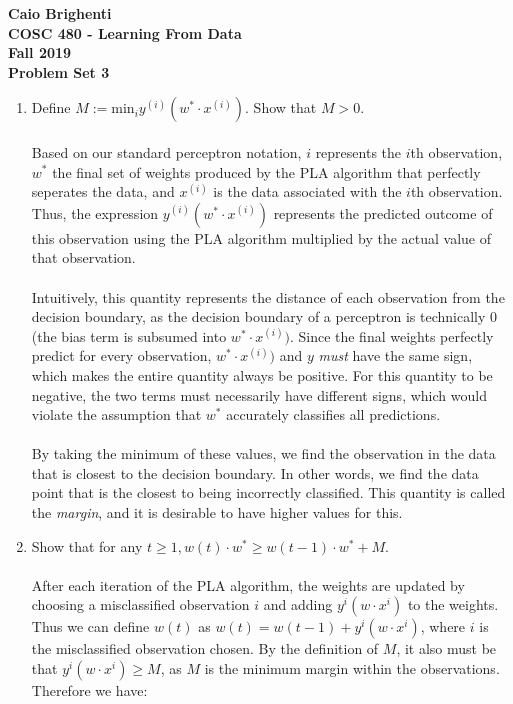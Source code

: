 \documentclass{article}
\begin{document}
\noindent \textbf{Caio Brighenti }\\
\noindent \textbf{COSC 480 - Learning From Data}\\%
\noindent \textbf{Fall 2019}\\%
\noindent \textbf{Problem Set 3}\vspace{1em}\\
\begin{enumerate}
	\item Define $M := \text{min}_i y^{(i)}(w^* \cdot x^{(i)})$. Show that $M > 0$.
	\\\\ Based on our standard perceptron notation, $i$ represents the $i$th observation, $w^*$ the final set of weights produced by the PLA algorithm that perfectly seperates the data, and $x^{(i)}$ is the data associated with the $i$th observation. Thus, the expression $y^{(i)}(w^* \cdot x^{(i)})$ represents the predicted outcome of this observation using the PLA algorithm multiplied by the actual value of that observation.
	\\\\ Intuitively, this quantity represents the distance of each observation from the decision boundary, as the decision boundary of a perceptron is technically 0 (the bias term is subsumed into $w^* \cdot x^{(i)})$. Since the final weights perfectly predict for every observation, $w^* \cdot x^{(i)})$ and $y$ \emph{must} have the same sign, which makes the entire quantity always be positive. For this quantity to be negative, the two terms must necessarily have different signs, which would violate the assumption that $w^*$ accurately classifies all predictions. 
	\\\\ By taking the minimum of these values, we find the observation in the data that is closest to the decision boundary. In other words, we find the data point that is the closest to being incorrectly classified. This quantity is called the \emph{margin}, and it is desirable to have higher values for this.
	\item Show that for any $ t \geq 1, w(t) \cdot w^* \geq w(t-1) \cdot w^* + M$.
	\\\\ After each iteration of the PLA algorithm, the weights are updated by choosing a misclassified observation $i$ and adding $y^i(w\cdot x^i)$ to the weights. Thus we can define $w(t)$ as $w(t) = w(t-1) + y^i(w\cdot x^i)$, where $i$ is the misclassified observation chosen. By the definition of $M$, it also must be that $y^i(w\cdot x^i) \geq M$, as $M$ is the minimum margin within the observations. Therefore we have:

\end{enumerate}
\end{document}
